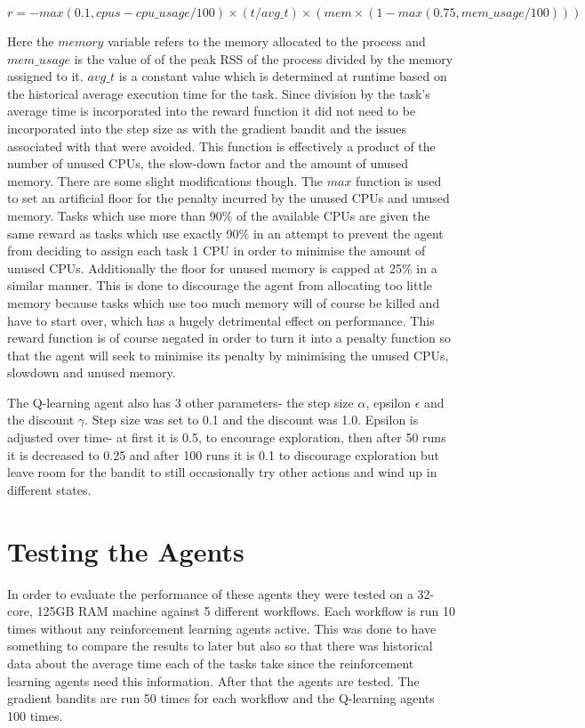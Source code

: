 \begin{equation}\label{q_agent_1_reward}
r = -max(0.1,cpus-cpu\_usage/100) \times (t/avg\_t) \times (mem\times (1 - max(0.75,mem\_usage/100)))
\end{equation}

Here the $memory$ variable refers to the memory allocated to the process and $mem\_usage$ is the value of of the peak RSS of the process divided by the memory assigned to it. $avg\_t$ is a constant value which is determined at runtime based on the historical average execution time for the task. Since division by the task’s average time is incorporated into the reward function it did not need to be incorporated into the step size as with the gradient bandit and the issues associated with that were avoided. This function is effectively a product of the number of unused CPUs, the slow-down factor and the amount of unused memory. There are some slight modifications though. The $max$ function is used to set an artificial floor for the penalty incurred by the unused CPUs and unused memory. Tasks which use more than 90\% of the available CPUs are given the same reward as tasks which use exactly 90\% in an attempt to prevent the agent from deciding to assign each task 1 CPU in order to minimise the amount of unused CPUs. Additionally the floor for unused memory is capped at 25\% in a similar manner. This is done to discourage the agent from allocating too little memory because tasks which use too much memory will of course be killed and have to start over, which has a hugely detrimental effect on performance. This reward function is of course negated in order to turn it into a penalty function so that the agent will seek to minimise its penalty by minimising the unused CPUs, slowdown and unused memory.

The Q-learning agent also has 3 other parameters- the step size $\alpha$, epsilon $\epsilon$ and the discount $\gamma$. Step size was set to 0.1 and the discount was 1.0. Epsilon is adjusted over time- at first it is 0.5, to encourage exploration, then after 50 runs it is decreased to 0.25 and after 100 runs it is 0.1 to discourage exploration but leave room for the bandit to still occasionally try other actions and wind up in different states.

\section{Testing the Agents}
\label{sec:testing}

In order to evaluate the performance of these agents they were tested on a 32-core, 125GB RAM machine against 5 different workflows. Each workflow is run 10 times without any reinforcement learning agents active. This was done to have something to compare the results to later but also so that there was historical data about the average time each of the tasks take since the reinforcement learning agents need this information. After that the agents are tested. The gradient bandits are run 50 times for each workflow and the Q-learning agents 100 times.

